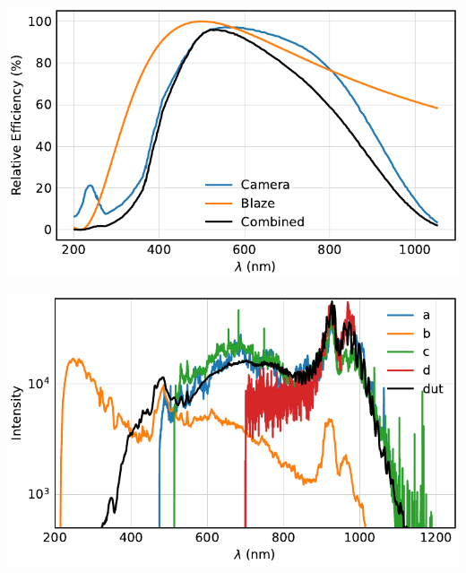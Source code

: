 

\begin{frame}
	\centering
	\includegraphics{../analysis/figures/expected.pdf}
\end{frame}

\begin{frame}
	\centering
	\includegraphics{../analysis/figures/efficiency_different.pdf}
\end{frame}

